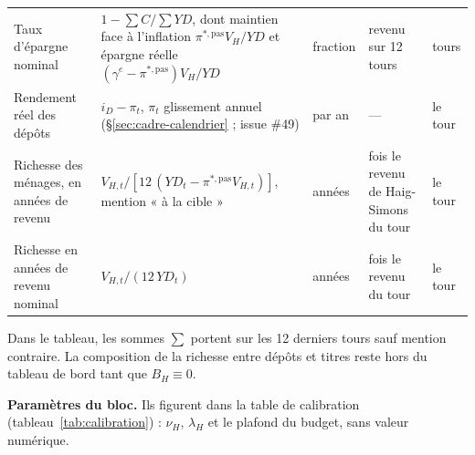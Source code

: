 \documentclass[11pt,a4paper]{article}
\begin{document}
\begin{center}
\begin{longtable}{>{\raggedright\arraybackslash}p{2.4cm}>{\raggedright\arraybackslash}p{5.6cm}>{\raggedright\arraybackslash}p{1.6cm}>{\raggedright\arraybackslash}p{2.6cm}>{\raggedright\arraybackslash}p{2.2cm}}
Taux d'épargne nominal & $1 - \sum C/\sum \mathit{YD}$, dont maintien face à l'inflation $\pi^{\ast,\mathrm{pas}} V_H/\mathit{YD}$ et épargne réelle $(\gamma^e - \pi^{\ast,\mathrm{pas}}) V_H/\mathit{YD}$ & fraction & revenu sur 12 tours & 12 tours\\
Rendement réel des dépôts & $i_D - \pi_t$, $\pi_t$ glissement annuel (\S\ref{sec:cadre-calendrier} ; issue \#49) & par an & --- & le tour\\
Richesse des ménages, en années de revenu & $V_{H,t}/[12\,(\mathit{YD}_t - \pi^{\ast,\mathrm{pas}} V_{H,t})]$, mention « à la cible » & années & 12 fois le revenu de Haig-Simons du tour & le tour\\
Richesse en années de revenu nominal & $V_{H,t}/(12\,\mathit{YD}_t)$ & années & 12 fois le revenu du tour & le tour\\
\bottomrule
\end{longtable}
\end{center}
Dans le tableau, les sommes $\sum$ portent sur les 12 derniers tours sauf mention contraire. La composition de la richesse entre dépôts et titres reste hors du tableau de bord tant que $B_H \equiv 0$.

\textbf{Paramètres du bloc.} Ils figurent dans la table de calibration (tableau~\ref{tab:calibration}) : $\nu_H$, $\lambda_H$ et le plafond du budget, sans valeur numérique.
\end{document}
